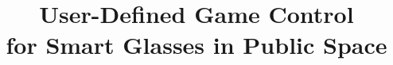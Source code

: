 \documentclass{sigchi}
\begin{document}
\title{User-Defined Game Control \\for Smart Glasses in Public Space}




\maketitle
\end{document}
